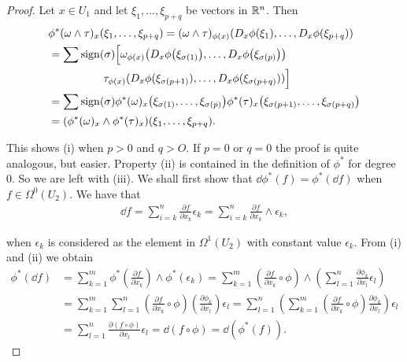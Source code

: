 \begin{proof}
  Let $x\in U_1$ and let $\xi_1, \ldots, \xi_{p+q}$ be vectors in ${\mathbb{R}}^n$. Then
  \begin{align*}
      & \phi^{*}(\omega\wedge\tau)_{x}(\xi_{1},\ldots,\xi_{p+q})
      = (\omega\wedge\tau)_{\phi(x)}(D_{x}\phi(\xi_{1}),\ldots,D_{x}\phi(\xi_{p+q})) \\
      & = \sum\mathrm{sign}(\sigma)\Big[\omega_{\phi(x)}\big(D_{x}\phi\big(\xi_{\sigma(1)}\big),\ldots,D_{x}\phi\big(\xi_{\sigma(p)}\big)\big) \\
      &\hspace*{5em} \tau_{\phi(x)}(D_x\phi(\xi_{\sigma(p+1)}),\ldots,D_x\phi(\xi_{\sigma(p+q)}))\Big] \\
      & = \sum\mathrm{sign}(\sigma)\phi^{*}(\omega)_{x}\big(\xi_{\sigma(1)},\ldots,\xi_{\sigma(p)}\big)
          \phi^{*}(\tau)_{x}\big(\xi_{\sigma(p+1)},\ldots,\xi_{\sigma(p+q)}\big) \\
      & = (\phi^{*}(\omega)_{x}\wedge\phi^{*}(\tau)_{x})(\xi_{1},\ldots,\xi_{p+q}).
  \end{align*}

  This shows (i) when $p > 0$ and $q > O$. If $p = 0$ or $q = 0$ the proof is quite
analogous, but easier. Property (ii) is contained in the definition of $\phi^*$ for degree
0. So we are left with (iii). We shall first show that $\dd\phi^*(f) = \phi^*(\!\dd f)$ when
$f\in \Omega^0(U_2)$. We have that
\begin{align*}
  \dd f = \sum_{i=k}^{n}\frac{\partial f}{\partial x_k}\epsilon_k
        = \sum_{i=k}^{n}\frac{\partial f}{\partial x_k}\wedge\epsilon_k,
\end{align*}

when $\epsilon_k$ is considered as the element in $\Omega^1(U_2)$ with constant value $\epsilon_k$. From
(i) and (ii) we obtain
\begin{align*}
    \phi^{*}(\!\dd f)
    & = \sum_{k=1}^m\phi^*\left(\frac{\partial f}{\partial x_k}\right)\wedge\phi^*(\epsilon_k)
        = \sum_{k=1}^m\left(\frac{\partial f}{\partial x_k}\circ\phi\right)\wedge\left(\sum_{l=1}^n\frac{\partial\phi_k}{\partial x_l}\epsilon_l\right) \\
    & = \sum_{k=1}^m\sum_{l=1}^n\left(\frac{\partial f}{\partial x_k}\circ\phi\right)\left(\frac{\partial\phi_k}{\partial x_l}\right)\epsilon_l
        = \sum_{l=1}^n\left(\sum_{k=1}^m\left(\frac{\partial f}{\partial x_k}\circ\phi\right)\frac{\partial\phi_k}{\partial x_l}\right)\epsilon_l \\
    & = \sum_{l=1}^n\frac{\partial(f\circ\phi)}{\partial x_l}\epsilon_l
        = \dd(f\circ\phi) = \dd(\phi^*(f)).
\end{align*}


\end{proof}

